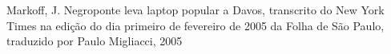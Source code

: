\documentclass[
12pt,		%
openright,	%
twoside,  %
a4paper,			%
chapter=TITLE,		%
english,			%
french,				%
spanish,			%
brazil				%
]{USPSC-classe/USPSC}
\begin{document}
\begin{flushleft}
\begin{flushleft}
\begin{flushleft}
\begin{flushleft}
\begin{flushleft}
\begin{flushleft}
\begin{flushleft}
\begin{flushleft}
\begin{flushleft}
\begin{flushleft}
[MARKOFF, 2005] Markoff, J. Negroponte leva laptop popular a Davos, transcrito do New York Times na edi\c{c}\~ao do dia primeiro de fevereiro de 2005 da Folha de S\~ao Paulo, traduzido por Paulo Migliacci, 2005
\end{flushleft}


\end{flushleft}


\end{flushleft}


\end{flushleft}


\end{flushleft}


\end{flushleft}


\end{flushleft}


\end{flushleft}


\end{flushleft}


\end{flushleft}
\end{document}
